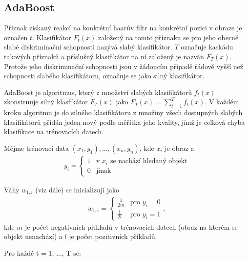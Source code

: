 \subsection{AdaBoost}
\label{subsec_adaboost}

	Příznak získaný reakcí na konkrétní haarův filtr na konkrétní pozici v obraze je označen $t$. Klasifikátor $F_t(x)$ založený na tomto příznaku se pro jeho obecně slabé diskriminační schopnosti nazývá slabý klasifikátor. $T$ označuje kaskádu takových příznaků a příslušný klasifikátor na ní založený je nazván $F_T(x)$. Protože jeho diskriminační schopnosti jsou v žádoucím případě řádově vyšší než schopnosti slabého klasifikátoru, označuje se jako silný klasifikátor.
	
	AdaBoost je algoritmus, který z množství slabých klasifikátorů $f_t(x)$ zkonstruuje silný klasfikátor $F_T(x)$ jako $F_T(x) = \sum_{t=1}^{T} f_t(x)$. V každém kroku algoritmu je do silného klasifikátoru z množiny všech dostupných slabých klasifikátorů přidán jeden nový podle měřítka jeho kvality, jímž je celková chyba klasifikace na trénovacích datech. 
	
	Mějme trénovací data $(x_1, y_1), ... ,(x_n, y_n)$, kde $x_i$ je obraz a 
	\begin{align}
	y_i = \begin{cases}
	1 & \text{v } x_i \text{ se nachází hledaný objekt} \\
	0 & \text{jinak}
	\end{cases}
	\end{align}  
	
	Váhy $w_{1,i}$ (viz dále)  se inicializují jako 
	\begin{align}
	w_{1,i} = \begin{cases}
	\frac{1}{2m} & \text{pro } y_i = 0\\
	\frac{1}{2l} & \text{pro } y_i = 1
	\end{cases},
	\end{align}
	kde $m$ je počet negativních příkladů v trénovacích datech (obraz na kterém se objekt nenachází) a $l$ je počet pozitivních příkladů.
	
	Pro každé t = 1, ..., T se:
	
